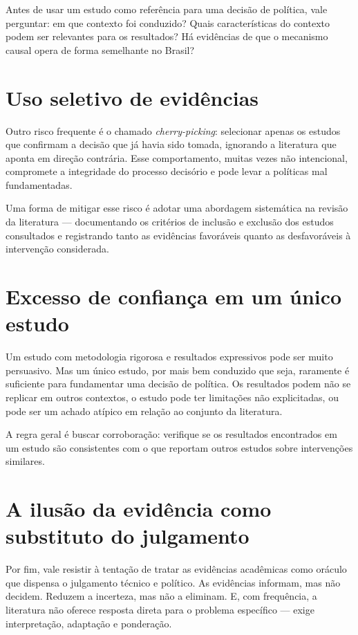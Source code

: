 \documentclass[12pt, a4paper, openany]{book}
\begin{document}
Antes de usar um estudo como referência para uma decisão de política, vale
perguntar: em que contexto foi conduzido? Quais características do contexto
podem ser relevantes para os resultados? Há evidências de que o mecanismo
causal opera de forma semelhante no Brasil?

\section{Uso seletivo de evidências}

Outro risco frequente é o chamado \textit{cherry-picking}: selecionar apenas
os estudos que confirmam a decisão que já havia sido tomada, ignorando a
literatura que aponta em direção contrária. Esse comportamento, muitas vezes
não intencional, compromete a integridade do processo decisório e pode levar
a políticas mal fundamentadas.

Uma forma de mitigar esse risco é adotar uma abordagem sistemática na
revisão da literatura --- documentando os critérios de inclusão e exclusão
dos estudos consultados e registrando tanto as evidências favoráveis quanto
as desfavoráveis à intervenção considerada.

\section{Excesso de confiança em um único estudo}

Um estudo com metodologia rigorosa e resultados expressivos pode ser muito
persuasivo. Mas um único estudo, por mais bem conduzido que seja, raramente
é suficiente para fundamentar uma decisão de política. Os resultados podem
não se replicar em outros contextos, o estudo pode ter limitações não
explicitadas, ou pode ser um achado atípico em relação ao conjunto da
literatura.

A regra geral é buscar corroboração: verifique se os resultados encontrados
em um estudo são consistentes com o que reportam outros estudos sobre
intervenções similares.

\section{A ilusão da evidência como substituto do julgamento}

Por fim, vale resistir à tentação de tratar as evidências acadêmicas como
oráculo que dispensa o julgamento técnico e político. As evidências informam,
mas não decidem. Reduzem a incerteza, mas não a eliminam. E, com frequência,
a literatura não oferece resposta direta para o problema específico --- exige
interpretação, adaptação e ponderação.
\end{document}
